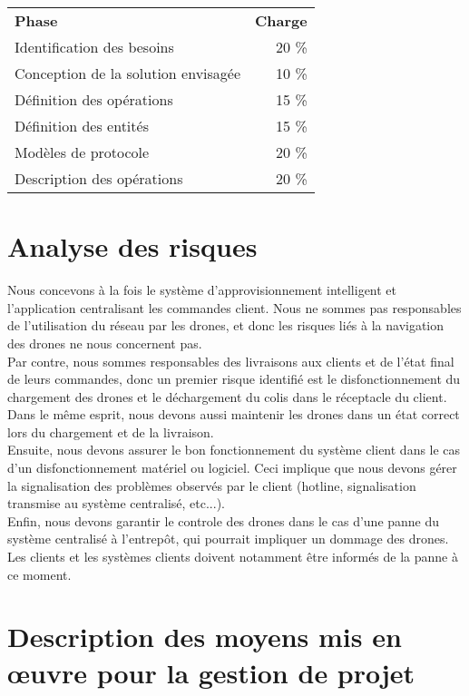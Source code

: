 \begin{center}
    \begin{tabular}{lr}
        \textbf{Phase} & \textbf{Charge} \\
    Identification des besoins & 20 \% \\
    Conception de la solution envisagée & 10 \% \\
    Définition des opérations & 15 \% \\
    Définition des entités & 15 \% \\
    Modèles de protocole & 20 \% \\
    Description des opérations & 20 \%
    \end{tabular}
\end{center}

\section{Analyse des risques}

Nous concevons à la fois le système d'approvisionnement intelligent et
l'application centralisant les commandes client. Nous ne sommes pas
responsables de l'utilisation du réseau par les drones, et donc les risques
liés à la navigation des drones ne nous concernent pas. \\

Par contre, nous sommes responsables des livraisons aux clients et de l'état
final de leurs commandes, donc un premier risque identifié est le
disfonctionnement du chargement des drones et le déchargement du colis dans le
réceptacle du client. Dans le même esprit, nous devons aussi maintenir les
drones dans un état correct lors du chargement et de la livraison. \\

Ensuite, nous devons assurer le bon fonctionnement du système client dans le
cas d'un disfonctionnement matériel ou logiciel. Ceci implique que nous devons
gérer la signalisation des problèmes observés par le client (hotline,
signalisation transmise au système centralisé, etc...). \\

Enfin, nous devons garantir le controle des drones dans le cas d'une panne du
système centralisé à l'entrepôt, qui pourrait impliquer un dommage des drones.
Les clients et les systèmes clients doivent notamment être informés de la panne
à ce moment.

\section{Description des moyens mis en œuvre pour la gestion de projet}

